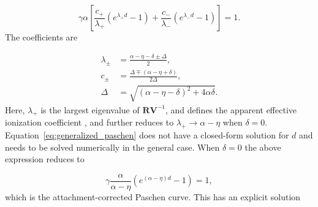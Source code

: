 \documentclass{iopjournal}
\newcommand{\e}{\ensuremath{\text{e}}}
\newcommand{\m}{\ensuremath{\text{m}}}
\newcommand{\M}{\ensuremath{\text{M}}}
\begin{document}


\begin{equation}
  \label{eq:generalized_paschen}
  \gamma\alpha\left[\frac{c_+}{\lambda_+}\left(e^{\lambda_+ d} - 1\right) + \frac{c_-}{\lambda_-}\left(e^{\lambda_- d} - 1\right)\right] = 1.
\end{equation}
The coefficients are

\begin{align}
  \lambda_\pm &= \frac{\alpha-\eta-\delta \pm \Delta}{2},\\
  c_\pm &= \frac{\Delta \mp (\alpha-\eta +\delta)}{2\Delta}, \\
  \Delta &= \sqrt{\left(\alpha-\eta-\delta\right)^2 + 4\alpha\delta}.
\end{align}
Here, $\lambda_+$ is the largest eigenvalue of $\bm{R}\bm{V}^{-1}$, and defines the apparent effective ionization coefficient \cite{Pancheshnyi2013}, and further reduces to $\lambda_+ \rightarrow \alpha-\eta$ when $\delta=0$.
Equation~\eqref{eq:generalized_paschen} does not have a closed-form solution for $d$ and needs to be solved numerically in the general case.
When $\delta = 0$ the above expression reduces to

\begin{equation}
  \label{eq:standard_paschen}
  \gamma \frac{\alpha}{\alpha-\eta}\left(e^{(\alpha-\eta)d} - 1\right) = 1,
\end{equation}
which is the attachment-corrected Paschen curve.
This has an explicit solution
\end{document}
